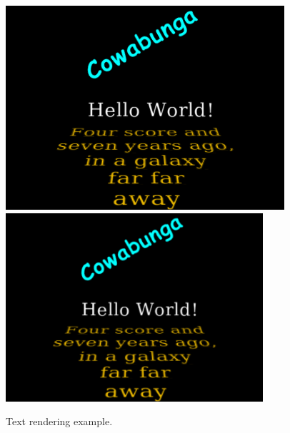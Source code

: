 \begin{figure}[ht]
\begin{center}
   \iflatexml
      \includegraphics[]{images/drawText}
   \else
      \includegraphics[width=3.75in]{images/drawText}
   \fi
\end{center}
\caption{Text rendering example.}
\label{drawText:fig}
\end{figure}

